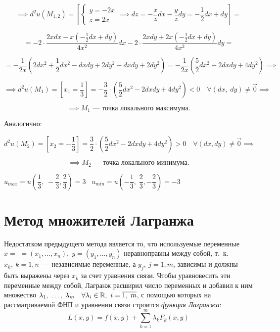\documentclass[../../main.tex]{subfiles}
\begin{document}
\begin{example}
	\[\implies d^2u\left(M_{1, 2}\right) = \left[
	\begin{cases}
	y = -2x\\
	z = 2x 
	\end{cases} \implies dz = -\dfrac{x}{z}dx - \dfrac{y}{z}dy = 
	-\dfrac{1}{2}dx + dy 
	\right] =\]
	
	\[= -2 \cdot \frac{2xdx - x\left(-\frac{1}{2}dx + dy\right)}{4x^2}dx - 
	2 \cdot \frac{2xdy + 2x \left(-\frac{1}{2}dx + dy\right)}{4x^2}dy =\]
	
	\[= -\dfrac{1}{2x}\left(2dx^2 + \dfrac{1}{2}dx^2 - dxdy + 2dy^2 - 
	dxdy + 2dy^2 \right) = -\dfrac{1}{2x} \left( \dfrac{5}
	{2} dx^2 - 2dxdy + 4dy^2 \right) \implies\]
	
	\[\implies d^2u\left(M_1\right) = \left[x_1 = \dfrac{1}{3}\right] = 
	-\dfrac{3}{2}\cdot\left(\dfrac{5}{2}dx^2 - 2dxdy + 
	4dy^2\right) < 0 \quad 
	\forall \left(dx, \; dy\right) \neq \vec{0} \implies\]
	
	\[\implies M_1 \text{~--- точка локального максимума}.\]
	
	Аналогично:
	
	\[d^2u \left(M_2\right) = \left[x_2 = -\dfrac{1}{3} \right] = 
	\dfrac{3}{2} \cdot \left( \dfrac{5}{2} dx^2 - 2dxdy + 4dy^2\right) > 0 
	\quad \forall \left(dx, dy\right) \neq \vec{0} \implies\]
	
	\[ \implies M_2 
	\text{~--- точка локального минимума}.\]
	
	$u_{max} = u\left(\dfrac{1}{3}, \; -\dfrac{2}{3}, 
	\dfrac{2}{3}\right) = 3 \;\;\; 
	u_{min} = u\left(-\dfrac{1}{3}, \; 
	\dfrac{2}{3}, -\dfrac{2}{3}\right) = -3$ 
\end{example}

	\section{Метод множителей Лагранжа} 
	
	Недостатком предыдущего метода является то, что используемые переменные 
	$x = $ $=\left(x_1, \ldots, x_n\right), \; y = \left(y_1,\ldots, y_n\right)$
	неравноправны между собой, т.~к. $x_k,\ k = \overline{1, n}$~--- 
	независимые переменные, а $y_j,\ j = \overline{1, m}$, зависимы и 
	должны быть выражены через $x_k$ за счет уравнения связи. 
	Чтобы уравновесить эти переменные между собой, Лагранж расширил 
	число переменных и добавил к ним множество 
	$\lambda_1,\; \ldots,\; \lambda_m\quad \forall 
	\lambda_i \in \mathbb{R},\ i = \overline{1,\; m}$, 
	с помощью которых на рассматриваемой ФНП и уравнении 
	связи строится \emph{функция Лагранжа}:
	\begin{equation}
	L\left(x, y\right) = f\left(x, y\right) + \sum\limits_{k = 1}^m 
	\lambda_k F_k\left(x, y\right) \label{lec11.1:8}
	\end{equation}
	
\end{document}
